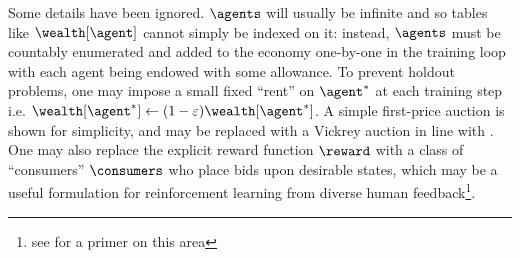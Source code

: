 Some details have been ignored. $\agents$ will usually be infinite and so tables like $\wealth[\agent]$ cannot simply be indexed on it: instead, $\agents$ must be countably enumerated and added to the economy one-by-one in the training loop with each agent being endowed with some allowance. To prevent holdout problems, one may impose a small fixed ``rent'' on $\agent^*$ at each training step i.e. $\wealth[\agent^*]\gets(1-\varepsilon)\wealth[\agent^*]$. A simple first-price auction is shown for simplicity, and may be replaced with a Vickrey auction in line with \citet{changDecentralizedReinforcementLearning2020}. One may also replace the explicit reward function $\reward$ with a class of ``consumers'' $\consumers$ who place bids upon desirable states, which may be a useful formulation for reinforcement learning from diverse human feedback\footnote{see \citep{conitzerPositionSocialChoice2024, geAxiomsAIAlignment2024a} for a primer on this area}.


